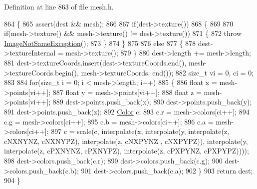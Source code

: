 Definition at line 863 of file mesh.\+h.


\begin{DoxyCode}
864 \{
865     assert(dest && mesh);
866 
867     \textcolor{keywordflow}{if}(dest->texture())
868     \{
869 
870         \textcolor{keywordflow}{if}(mesh->texture() && mesh->texture() != dest->texture())
871         \{
872             \textcolor{keywordflow}{throw} \hyperlink{classImageNotSameException}{ImageNotSameException}();
873         \}
874     \}
875 
876     \textcolor{keywordflow}{else}
877     \{
878         dest->textureInternal = mesh->texture();
879     \}
880     dest->length += mesh->length;
881     dest->textureCoords.insert(dest->textureCoords.end(), mesh->textureCoords.begin(), mesh->textureCoords.
      end());
882     \textcolor{keywordtype}{size\_t} vi = 0, ci = 0;
883 
884     \textcolor{keywordflow}{for}(\textcolor{keywordtype}{size\_t} i = 0; i < mesh->length; i++)
885     \{
886         \textcolor{keywordtype}{float} x = mesh->points[vi++];
887         \textcolor{keywordtype}{float} y = mesh->points[vi++];
888         \textcolor{keywordtype}{float} z = mesh->points[vi++];
889         dest->points.push\_back(x);
890         dest->points.push\_back(y);
891         dest->points.push\_back(z);
892         \hyperlink{structColor}{Color} c;
893         c.r = mesh->colors[ci++];
894         c.g = mesh->colors[ci++];
895         c.b = mesh->colors[ci++];
896         c.a = mesh->colors[ci++];
897         c = scale(c, interpolate(x, interpolate(y, interpolate(z, cNXNYNZ, cNXNYPZ), interpolate(z, cNXPYNZ
      , cNXPYPZ)), interpolate(y, interpolate(z, cPXNYNZ, cPXNYPZ), interpolate(z, cPXPYNZ, cPXPYPZ))));
898         dest->colors.push\_back(c.r);
899         dest->colors.push\_back(c.g);
900         dest->colors.push\_back(c.b);
901         dest->colors.push\_back(c.a);
902     \}
903     \textcolor{keywordflow}{return} dest;
904 \}
\end{DoxyCode}
